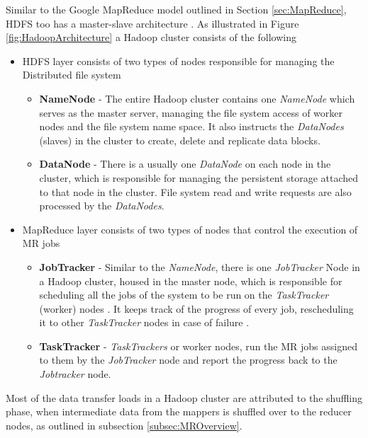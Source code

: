 Similar to the Google MapReduce model \cite{dean2008mapreduce} outlined in Section \ref{sec:MapReduce}, HDFS too has a master-slave architecture \cite{borthakur2008hdfs}. As illustrated in Figure \ref{fig:HadoopArchitecture} a Hadoop cluster consists of the following
\begin{itemize}
	\item HDFS layer consists of two types of nodes responsible for managing the Distributed file system 
    	 \begin{itemize}
		  \item \textbf{NameNode} - The entire Hadoop cluster contains one \textit{NameNode} which serves as the master server, managing the file system access of worker nodes and the file system name space. It also instructs the \textit{DataNodes} (slaves) in the cluster to create, delete and replicate data blocks.
		  \item \textbf{DataNode} - There is a usually one \textit{DataNode} on each node in the cluster, which is responsible for managing the persistent storage attached to that node in the cluster. File system read and write requests are also processed by the \textit{DataNodes}.    
		  \end{itemize}
    \item MapReduce layer consists of two types of nodes that control the execution of MR jobs \cite{white2012hadoop} 
    	 \begin{itemize}
		  \item \textbf{JobTracker} - Similar to the \textit{NameNode}, there is one \textit{JobTracker} Node in a Hadoop cluster, housed in the master node, which is responsible for scheduling all the jobs of the system to be run on the \textit{TaskTracker} (worker) nodes \cite{white2012hadoop}. It keeps track of the progress of every job, rescheduling it to other \textit{TaskTracker} nodes in case of failure \cite{white2012hadoop}. 
		  \item \textbf{TaskTracker} - \textit{TaskTrackers} or worker nodes, run the MR jobs assigned to them by the \textit{JobTracker} node and report the progress back to the \textit{Jobtracker} \cite{white2012hadoop} node. 
		  \end{itemize}
\end{itemize}

Most of the data transfer loads in a Hadoop cluster are attributed to the shuffling phase, when intermediate data from the mappers is shuffled over to the reducer nodes, as outlined in subsection \ref{subsec:MROverview}. 

